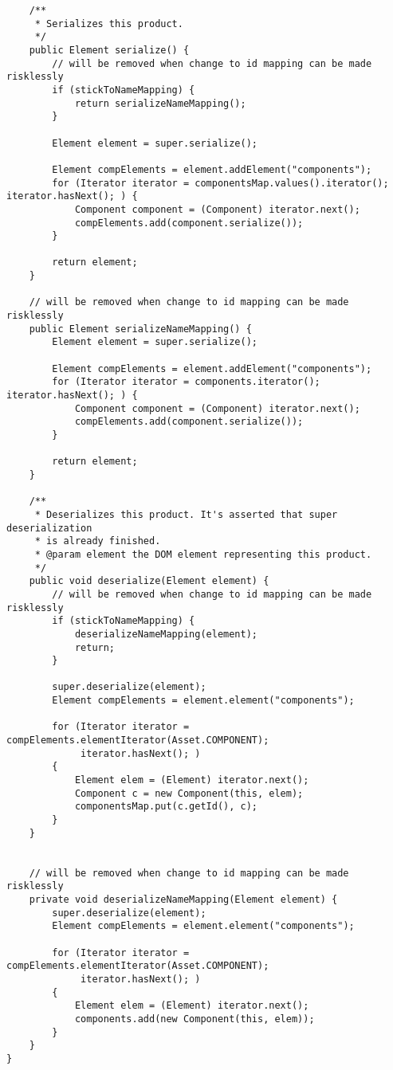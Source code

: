 \begin{verbatim}
	/**
	 * Serializes this product.
	 */
	public Element serialize() {
        // will be removed when change to id mapping can be made risklessly
		if (stickToNameMapping) {
            return serializeNameMapping();
        }
        
		Element element = super.serialize();
		
		Element compElements = element.addElement("components");
		for (Iterator iterator = componentsMap.values().iterator(); iterator.hasNext(); ) {
			Component component = (Component) iterator.next();
			compElements.add(component.serialize());
		}
		
		return element;
	}
	
    // will be removed when change to id mapping can be made risklessly
    public Element serializeNameMapping() {
        Element element = super.serialize();
        
        Element compElements = element.addElement("components");
        for (Iterator iterator = components.iterator(); iterator.hasNext(); ) {
            Component component = (Component) iterator.next();
            compElements.add(component.serialize());
        }
        
        return element;
    }

    /**
	 * Deserializes this product. It's asserted that super deserialization
	 * is already finished.
	 * @param element the DOM element representing this product.
	 */
    public void deserialize(Element element) {
        // will be removed when change to id mapping can be made risklessly
        if (stickToNameMapping) {
            deserializeNameMapping(element);
            return;
        }
        
        super.deserialize(element);
        Element compElements = element.element("components");
        
        for (Iterator iterator = compElements.elementIterator(Asset.COMPONENT);
             iterator.hasNext(); )
        {
            Element elem = (Element) iterator.next();
            Component c = new Component(this, elem);
            componentsMap.put(c.getId(), c);
        }
    }
    
    
    // will be removed when change to id mapping can be made risklessly
	private void deserializeNameMapping(Element element) {
		super.deserialize(element);
	    Element compElements = element.element("components");
		
		for (Iterator iterator = compElements.elementIterator(Asset.COMPONENT);
			 iterator.hasNext(); )
		{
			Element elem = (Element) iterator.next();
			components.add(new Component(this, elem)); 
		}
	}
}

\end{verbatim}
